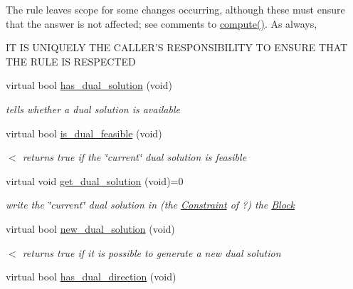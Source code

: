 \begin{Indent}
{The rule leaves scope for some changes occurring, although these must ensure that the answer is not affected; see comments to \mbox{\hyperlink{class_s_m_spp__di__unipi__it_1_1_solver_a504d4e3e174c7a518cc66156a8a45ce5}{compute()}}. As always, \begin{DoxyVerb}          IT IS UNIQUELY THE CALLER'S RESPONSIBILITY
            TO ENSURE THAT THE RULE IS RESPECTED\end{DoxyVerb}
 }\begin{DoxyCompactItemize}
\item 
virtual bool \mbox{\hyperlink{class_s_m_spp__di__unipi__it_1_1_c_d_a_solver_a26970b0da7f4f7b56bcfc890983d9a40}{has\+\_\+dual\+\_\+solution}} (void)
\begin{DoxyCompactList}\small\item\em tells whether a dual solution is available \end{DoxyCompactList}\item 
virtual bool \mbox{\hyperlink{class_s_m_spp__di__unipi__it_1_1_c_d_a_solver_a974e986ce1a04d44660bb5c573e8315d}{is\+\_\+dual\+\_\+feasible}} (void)
\begin{DoxyCompactList}\small\item\em $<$ returns true if the \char`\"{}current\char`\"{} dual solution is feasible \end{DoxyCompactList}\item 
virtual void \mbox{\hyperlink{class_s_m_spp__di__unipi__it_1_1_c_d_a_solver_a347d37171494bf83416a48b279b94d5a}{get\+\_\+dual\+\_\+solution}} (void)=0
\begin{DoxyCompactList}\small\item\em write the \char`\"{}current\char`\"{} dual solution in (the \mbox{\hyperlink{class_s_m_spp__di__unipi__it_1_1_constraint}{Constraint}} of ?) the \mbox{\hyperlink{class_s_m_spp__di__unipi__it_1_1_block}{Block}} \end{DoxyCompactList}\item 
virtual bool \mbox{\hyperlink{class_s_m_spp__di__unipi__it_1_1_c_d_a_solver_a8c650415b6673c33692c363abdfdef00}{new\+\_\+dual\+\_\+solution}} (void)
\begin{DoxyCompactList}\small\item\em $<$ returns true if it is possible to generate a new dual solution \end{DoxyCompactList}\item 
virtual bool \mbox{\hyperlink{class_s_m_spp__di__unipi__it_1_1_c_d_a_solver_a4247feaa72c255f28a2a71b5e634b60a}{has\+\_\+dual\+\_\+direction}} (void)

\end{DoxyCompactItemize}
\end{Indent}
